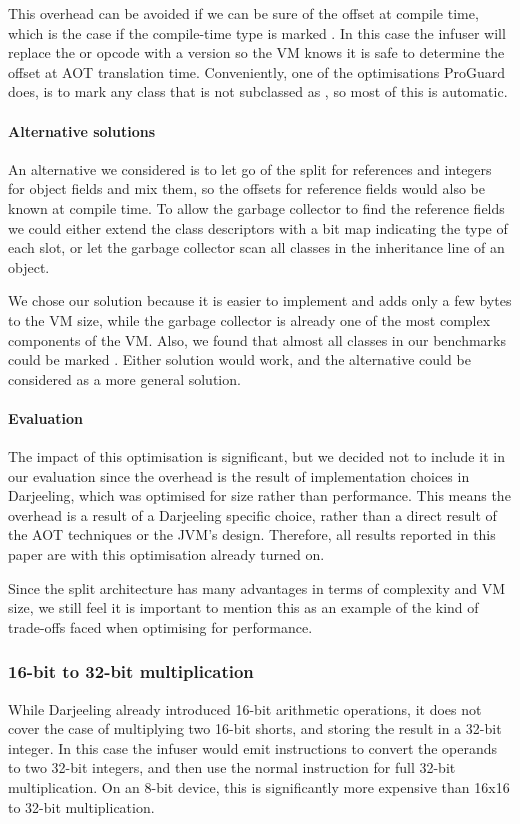 This overhead can be avoided if we can be sure of the offset at compile time, which is the case if the compile-time type is marked . In this case the infuser will replace the  or  opcode with a  version so the VM knows it is safe to determine the offset at AOT translation time. Conveniently, one of the optimisations ProGuard does, is to mark any class that is not subclassed as , so most of this is automatic.

\paragraph{Alternative solutions} An alternative we considered is to let go of the split for references and integers for object fields and mix them, so the offsets for reference fields would also be known at compile time. To allow the garbage collector to find the reference fields we could either extend the class descriptors with a bit map indicating the type of each slot, or let the garbage collector scan all classes in the inheritance line of an object.

We chose our solution because it is easier to implement and adds only a few bytes to the VM size, while the garbage collector is already one of the most complex components of the VM. Also, we found that almost all classes in our benchmarks could be marked . Either solution would work, and the alternative could be considered as a more general solution.

\paragraph{Evaluation}
The impact of this optimisation is significant, but we decided not to include it in our evaluation since the overhead is the result of implementation choices in Darjeeling, which was optimised for size rather than performance. This means the overhead is a result of a Darjeeling specific choice, rather than a direct result of the AOT techniques or the JVM's design. Therefore, all results reported in this paper are with this optimisation already turned on.

Since the split architecture has many advantages in terms of complexity and VM size, we still feel it is important to mention this as an example of the kind of trade-offs faced when optimising for performance.

\subsubsection{ 16-bit to 32-bit multiplication}
While Darjeeling already introduced 16-bit arithmetic operations, it does not cover the case of multiplying two 16-bit shorts, and storing the result in a 32-bit integer. In this case the infuser would emit  instructions to convert the operands to two 32-bit integers, and then use the normal  instruction for full 32-bit multiplication. On an 8-bit device, this is significantly more expensive than 16x16 to 32-bit multiplication.

